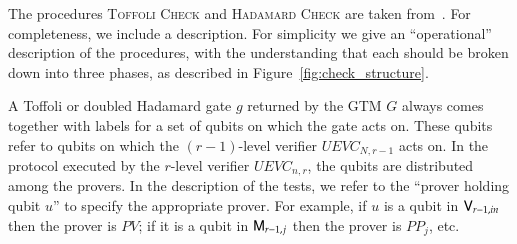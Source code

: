 The procedures  \textsc{Toffoli Check} and \textsc{Hadamard Check} are taken from~\cite{ji2016compression}. For completeness, we include a description. For simplicity we give an ``operational'' description of the procedures, with the understanding that each should be broken down into three phases, as described in Figure~\ref{fig:check_structure}.

A Toffoli or doubled Hadamard gate $g$ returned by the GTM $G$ always comes together with labels for a set of qubits on which the gate acts on. These qubits refer to qubits on which the $(r-1)$-level verifier $UEVC_{N,r-1}$ acts on. In the protocol executed by the $r$-level verifier $UEVC_{n,r}$, the qubits are distributed among the provers. In the description of the tests, we refer to the ``prover holding qubit $u$'' to specify the appropriate prover. For example, if $u$ is a qubit in ${\textsf{V}}_{r-1,in}$ then the prover is $PV$; if it is a qubit in ${\textsf{M}}_{r-1,j}$ then the prover is $PP_j$, etc. 


